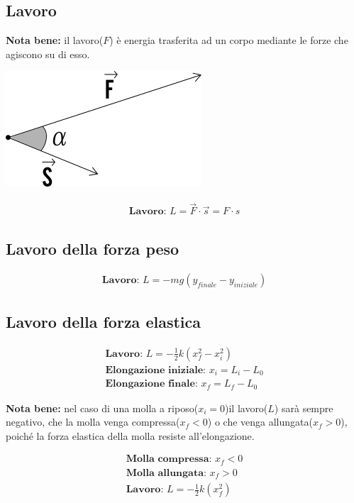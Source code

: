 \subsection{Lavoro}

\textbf{Nota bene: } il lavoro($F$) è energia trasferita ad un corpo mediante le forze che agiscono su di esso. \\
\begin{center}
    \includegraphics[width=0.4 \linewidth]{Dinamica/Lavoro/il-lavoro-di-una-forza.png}    
\end{center}
\begin{gather*}
    \textbf{Lavoro: } L = \vec{F} \cdot \vec{s} = F \cdot  s
\end{gather*}

\subsection{Lavoro della forza peso}

\begin{gather*}
    \textbf{Lavoro: } L = -mg(y_{finale} - y_{iniziale})
\end{gather*}

\subsection{Lavoro della forza elastica}

\begin{gather*}
    \textbf{Lavoro: } L = - \frac{1}{2} k (x_f^2 - x_i^2) \\
    \textbf{Elongazione iniziale: } x_i = L_i - L_0 \\
    \textbf{Elongazione finale: } x_f = L_f - L_0
\end{gather*}

\textbf{Nota bene: } nel caso di una molla a riposo($x_i = 0$)il lavoro($L$) sarà sempre negativo, che la molla venga compressa($x_f < 0$) o che venga allungata($x_f > 0$), poiché la forza elastica della molla resiste all'elongazione.

\begin{gather*}
    \textbf{Molla compressa: } x_f < 0 \\
    \textbf{Molla allungata: } x_f > 0 \\
    \textbf{Lavoro: } L = - \frac{1}{2} k (x_f^2)
\end{gather*}